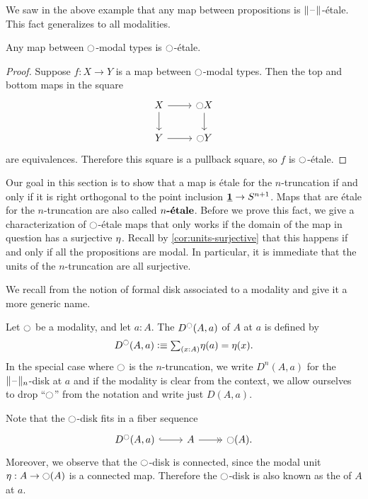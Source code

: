 \documentclass[9pt,twosided]{amsart}
\begin{document}
We saw in the above example that any map between propositions is $\brck{\blank}$-\'etale. This fact generalizes to all modalities.

\begin{lem}\label{lem:etale_modal}
Any map between ${\ocircle}$-modal types is ${\ocircle}$-\'etale.
\end{lem}

\begin{proof}
Suppose $f:X\to Y$ is a map between ${\ocircle}$-modal types. Then the top and bottom maps in the square
\begin{equation*}
\begin{tikzcd}
X \arrow[r] \arrow[d] & \modal X \arrow[d] \\
Y \arrow[r] & \modal Y
\end{tikzcd}
\end{equation*}
are equivalences. Therefore this square is a pullback square, so $f$ is ${\ocircle}$-\'etale.
\end{proof}

Our goal in this section is to show that a map is \'etale for the $n$-truncation if and only if it is right orthogonal to the point inclusion $\underline{\mathbf{1}}\to S^{n+1}$. Maps that are \'etale for the $n$-truncation are also called $\textbf{$n$-\'etale}$.
Before we prove this fact, we give a characterization of ${\ocircle}$-\'etale maps that only works if the domain of the map in question has a surjective ${\eta_{}}$. Recall by \cref{cor:units-surjective} that this happens if and only if all the propositions are modal. In particular, it is immediate that the units of the $n$-truncation are all surjective.

We recall from \cite{wellen-thesis} the notion of formal disk associated to a modality and give it a more generic name.

\begin{defn}
  Let ${\ocircle}$ be a modality, and let $a:A$. The  $D^{{\ocircle}}(A,a)$ of $A$ at $a$ is defined by
  \begin{equation*}
    D^\modal(A,a)\defeq \sm{x:A}\eta(a)=\eta(x).
  \end{equation*}
  In the special case where ${\ocircle}$ is the $n$-truncation, we write $D^n(A,a)$ for the $\trunc{n}{\blank}$-disk at $a$ and if the modality is clear from the context, we allow ourselves to drop ``${\ocircle}$'' from the notation and write just $D(A,a)$.
\end{defn}

Note that the ${\ocircle}$-disk fits in a fiber sequence
\begin{equation*}
  \begin{tikzcd}
    D^\modal(A,a) \arrow[r,hook] & A \arrow[r,->>] & \modal(A).
  \end{tikzcd}
\end{equation*}
Moreover, we observe that the ${\ocircle}$-disk is connected, since the modal unit $\eta:A\to{\ensuremath{\ocircle}}(A)$ is a connected map. Therefore the ${\ocircle}$-disk is also known as the  of $A$ at $a$.
\end{document}
